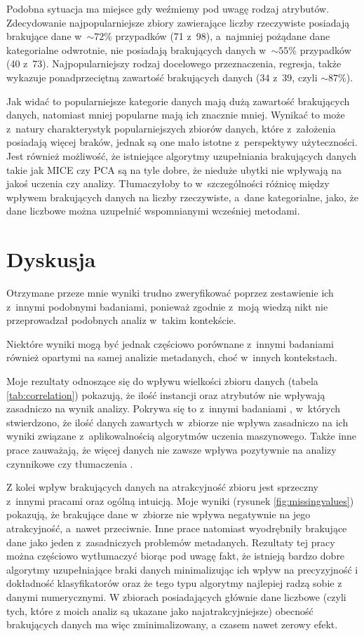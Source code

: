 Podobna sytuacja ma miejsce gdy weźmiemy pod uwagę rodzaj atrybutów.
Zdecydowanie najpopularniejsze zbiory zawierające liczby rzeczywiste posiadają brakujące dane w~\(\sim 72\%\) przypadków (71 z~98), a~najmniej pożądane dane kategorialne odwrotnie, nie posiadają brakujących danych w~\(\sim 55\%\) przypadków (40 z~73).
Najpopularniejszy rodzaj docelowego przeznaczenia, regresja, także wykazuje ponadprzeciętną zawartość brakujących danych (34 z~39, czyli \(\sim 87\%\)).

Jak widać to popularniejsze kategorie danych mają dużą zawartość brakujących danych, natomiast mniej popularne mają ich znacznie mniej.
Wynikać to może z~natury charakterystyk popularniejszych zbiorów danych, które z~założenia posiadają więcej braków, jednak są one mało istotne z~perspektywy użyteczności.
Jest również możliwość, że istniejące algorytmy uzupełniania brakujących danych takie jak MICE czy PCA są na tyle dobre, że nieduże ubytki nie wpływają na jakoś uczenia czy analizy.
Tłumaczyłoby to w~szczególności różnicę między wpływem brakujących danych na liczby rzeczywiste, a~dane kategorialne, jako, że dane liczbowe można uzupełnić wspomnianymi wcześniej metodami.

\section{Dyskusja}

Otrzymane przeze mnie wyniki trudno zweryfikować poprzez zestawienie ich z~innymi podobnymi badaniami, ponieważ zgodnie z~moją wiedzą nikt nie przeprowadzał podobnych analiz w~takim kontekście.

Niektóre wyniki mogą być jednak częściowo porównane z~innymi badaniami również opartymi na samej analizie metadanych, choć w~innych kontekstach.

Moje rezultaty odnoszące się do wpływu wielkości zbioru danych (tabela \ref{tab:correlation}) pokazują, że ilość instancji oraz atrybutów nie wpływają zasadniczo na wynik analizy.
Pokrywa się to z~innymi badaniami \cite{brazdil1994characterizing}, w~których stwierdzono, że ilość danych zawartych w~zbiorze nie wpływa zasadniczo na ich wyniki związane z~aplikowalnością algorytmów uczenia maszynowego.
Także inne prace zauważają, że więcej danych nie zawsze wpływa pozytywnie na analizy czynnikowe \cite{boivin2006more} czy tłumaczenia \cite{gasco2012does}.

Z kolei wpływ brakujących danych na atrakcyjność zbioru jest sprzeczny z~innymi pracami oraz ogólną intuicją.
Moje wyniki (rysunek \ref{fig:missingvalues}) pokazują, że brakujące dane w~zbiorze nie wpływa negatywnie na jego atrakcyjność, a~nawet przeciwnie.
Inne prace \cite{yasser2011analysis} natomiast wyodrębniły brakujące dane jako jeden z~zasadniczych problemów metadanych.
Rezultaty tej pracy można częściowo wytłumaczyć biorąc pod uwagę fakt, że istnieją bardzo dobre algorytmy uzupełniające braki danych minimalizując ich wpływ na precyzyjność i dokładność klasyfikatorów \cite{acuna2004treatment} oraz że tego typu algorytmy najlepiej radzą sobie z danymi numerycznymi.
W zbiorach posiadających głównie dane liczbowe (czyli tych, które z moich analiz są ukazane jako najatrakcyjniejsze) obecność brakujących danych ma więc zminimalizowany, a czasem nawet zerowy efekt.

